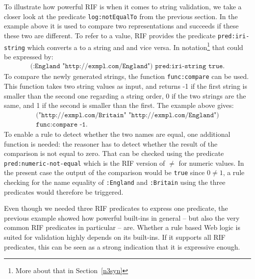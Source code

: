 To illustrate  how powerful RIF is when it comes to string validation, we take a closer look at the predicate \texttt{log:notEqualTo} from the previous section. 
In the example above it is used to compare two \uri representations and succeeds if these these two are different. To refer to a \uri value, RIF provides the predicate 
\texttt{pred:iri-string} which converts a \uri to a string and and vice versa. In \nthree notation\footnote{More about that in Section~\ref{n3syn}} 
that could be expressed by:
\begin{multline}
\texttt{(:England "http://exmpl.com/England") pred:iri-string true.}
\end{multline}
To compare the newly generated strings, the function \texttt{func:compare} can be used. This function takes two string values as input,
and returns -1 if the first string 
is smaller
than the second one regarding a string order, 0 if the two strings are the same, and 1 if the second is smaller than the first. The example above gives:
\begin{multline}
 \texttt{("http://exmpl.com/Britain" "http://exmpl.com/England")}\\ \texttt{func:compare -1.}
\end{multline}
\sloppy
To enable a rule to detect whether the two \uri names are equal, one additional function is needed: the reasoner has to detect whether the result of the comparison
is not equal to zero. 
That can be checked using the predicate \texttt{pred:numeric-not-equal} which is the RIF version of $\neq$ for numeric values. In the present case the output 
of the comparison would be 
\texttt{true} since $0\neq 1$, a rule checking for the name equality of \texttt{:England} and \texttt{:Britain} using the three predicates would therefore be triggered.

Even though we needed three RIF predicates to express one \nthree predicate, the previous example showed how powerful built-ins in general -- but also the very common RIF predicates
in particular -- are. Whether a rule based Web logic is suited for \rdf validation highly depends on its built-ins. If it supports all RIF predicates, this can be seen as a strong
indication that it is expressive enough.


